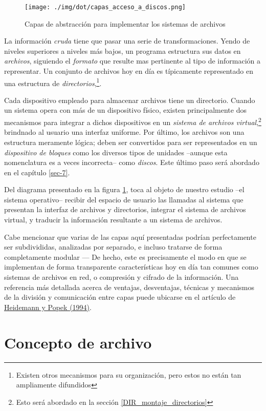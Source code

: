 \documentclass[11pt,fleqn]{book} %
\begin{document}
\begin{figure}[htb]
\centering
\texttt{[image: ./img/dot/capas\_acceso\_a\_discos.png]}
\caption{\label{DIR_capas_acceso_a_discos}Capas de abstracción para implementar los sistemas de archivos}
\end{figure}

La información \emph{cruda} tiene que pasar una serie de
transformaciones. Yendo de niveles superiores a niveles más bajos, un
programa estructura sus datos en \emph{archivos}, siguiendo el \emph{formato}
que resulte mas pertinente al tipo de información a representar. Un
conjunto de archivos hoy en día es típicamente representado en una
estructura de \emph{directorios},\footnote{Existen otros mecanismos para su
organización, pero estos no están tan ampliamente difundidos }.

Cada dispositivo empleado para almacenar archivos tiene un directorio.
Cuando un sistema opera con más de un dispositivo físico, existen
principalmente dos mecanismos para integrar a dichos dispositivos en
un \emph{sistema de archivos virtual},\footnote{Esto será abordado en la
sección \ref{DIR_montaje_directorios} } brindnado al usuario una
interfaz uniforme. Por último, los archivos son una estructura
meramente lógica; deben ser convertidos para ser representados en un
\emph{dispositivo de bloques} como los diversos tipos de unidades –aunque
esta nomenclatura es a veces incorrecta– como \emph{discos}. Este último
paso será abordado en el capítulo \ref{sec-7}.

Del diagrama presentado en la figura \ref{DIR_capas_acceso_a_discos},
toca al objeto de nuestro estudio –el sistema operativo– recibir del
espacio de usuario las llamadas al sistema que presentan la interfaz
de archivos y directorios, integrar el sistema de archivos virtual, y
traducir la información resultante a un sistema de archivos.

Cabe mencionar que varias de las capas aquí presentadas podrían
perfectamente ser subdivididas, analizadas por separado, e incluso
tratarse de forma completamente modular — De hecho, este es
precisamente el modo en que se implementan de forma transparente
características hoy en día tan comunes como sistemas de archivos en
red, o compresión y cifrado de la información. Una referencia más
detallada acerca de ventajas, desventajas, técnicas y mecanismos de la
división y comunicación entre capas puede ubicarse en el artículo de
\href{https://dl.acm.org/citation.cfm?doid=174613.174616}{Heidemann y Popek (1994)}.
\section{Concepto de archivo}
\label{sec-6-2}
\end{document}
